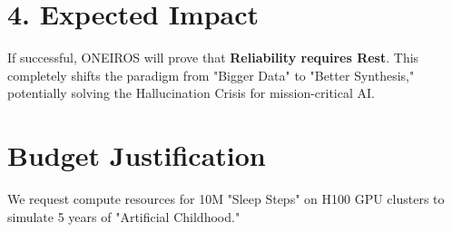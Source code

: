 \documentclass{article}
\begin{document}
\section{4. Expected Impact}
If successful, ONEIROS will prove that \textbf{Reliability requires Rest}. This completely shifts the paradigm from "Bigger Data" to "Better Synthesis," potentially solving the Hallucination Crisis for mission-critical AI.

\section{Budget Justification}
We request compute resources for 10M "Sleep Steps" on H100 GPU clusters to simulate 5 years of "Artificial Childhood."

\printbibliography
\end{document}
